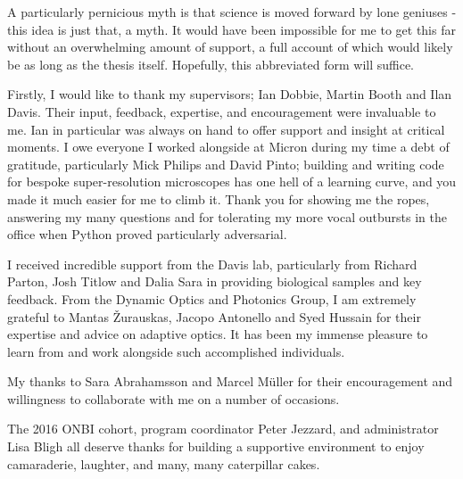 \begin{acknowledgements}
	
	\vspace{-0.75cm}
	
	{\small %
		
		A particularly pernicious myth is that science is moved forward by 
		lone geniuses - this idea is just that, a myth. It would have been 
		impossible for me to get this far without an overwhelming amount of 
		support, a full account of which would likely be as long as the 
		thesis itself. Hopefully, this abbreviated form  will suffice.
		
		Firstly, I would like to thank my supervisors; Ian Dobbie, Martin 
		Booth and Ilan Davis. Their input, feedback, expertise, and 
		encouragement were invaluable to me. Ian in particular was always 
		on hand to offer support and insight at critical moments. I owe 
		everyone I worked alongside at Micron during my time a debt of 
		gratitude, particularly Mick Philips and David Pinto; building and 
		writing code for bespoke super-resolution microscopes has one hell 
		of a learning curve, and you made it much easier for me to climb 
		it. Thank you for showing me the ropes, answering my many questions 
		and for tolerating my more vocal outbursts in the office when 
		Python proved particularly adversarial. 
		
		I received incredible support from the Davis lab, particularly from Richard Parton, Josh Titlow and Dalia Sara in providing biological 
		samples and key feedback. From the Dynamic Optics and Photonics 
		Group, I am extremely grateful to Mantas \v{Z}urauskas, Jacopo 
		Antonello and Syed Hussain for their expertise and advice on 
		adaptive optics. It has been my immense pleasure to learn from and 
		work alongside such accomplished individuals. 
		
		My thanks to Sara Abrahamsson and Marcel M\"{u}ller for their encouragement and willingness to collaborate with me on a number of occasions. 
		
		The 2016 ONBI cohort, program coordinator Peter Jezzard, and 
		administrator Lisa Bligh all deserve thanks for building a 
		supportive environment to enjoy camaraderie, laughter, and many, 
		many caterpillar cakes.
		
}
\end{acknowledgements}
